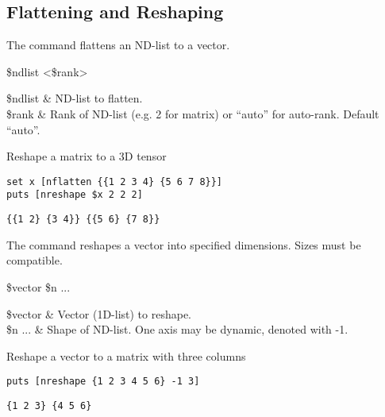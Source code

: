\subsection{Flattening and Reshaping}
The command  flattens an ND-list to a vector.
\begin{syntax}
 \$ndlist <\$rank>
\end{syntax}
\begin{args}
\$ndlist & ND-list to flatten. \\
\$rank & Rank of ND-list (e.g. 2 for matrix) or ``auto'' for auto-rank. Default ``auto''.
\end{args}
\begin{example}{Reshape a matrix to a 3D tensor}
\begin{lstlisting}
set x [nflatten {{1 2 3 4} {5 6 7 8}}]
puts [nreshape $x 2 2 2]
\end{lstlisting}
\tcblower
\begin{lstlisting}
{{1 2} {3 4}} {{5 6} {7 8}}
\end{lstlisting}
\end{example}

The command  reshapes a vector into specified dimensions.
Sizes must be compatible.
\begin{syntax}
 \$vector \$n ...
\end{syntax}
\begin{args}
\$vector & Vector (1D-list) to reshape. \\
\$n ... & Shape of ND-list. One axis may be dynamic, denoted with -1.
\end{args}
\begin{example}{Reshape a vector to a matrix with three columns}
\begin{lstlisting}
puts [nreshape {1 2 3 4 5 6} -1 3]
\end{lstlisting}
\tcblower
\begin{lstlisting}
{1 2 3} {4 5 6}
\end{lstlisting}
\end{example}


\clearpage


